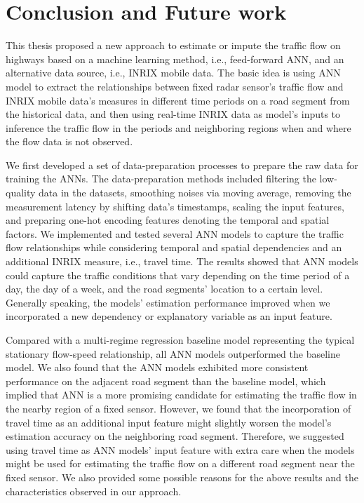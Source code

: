 \documentclass[english]{kththesis}
\begin{document}
\chapter{Conclusion and Future work}
\label{ch:conclusionAndFutureWork}
This thesis proposed a new approach to estimate or impute the traffic flow on highways based on a machine learning method, i.e., feed-forward ANN, and an alternative data source, i.e., INRIX mobile data. The basic idea is using ANN model to extract the relationships between fixed radar sensor's traffic flow and INRIX mobile data's measures in different time periods on a road segment from the historical data, and then using real-time INRIX data as model's inputs to inference the traffic flow in the periods and neighboring regions when and where the flow data is not observed. 

We first developed a set of data-preparation processes to prepare the raw data for training the ANNs. The data-preparation methods included filtering the low-quality data in the datasets, smoothing noises via moving average, removing the measurement latency by shifting data's timestamps, scaling the input features, and preparing one-hot encoding features denoting the temporal and spatial factors. We implemented and tested several ANN models to capture the traffic flow relationships while considering temporal and spatial dependencies and an additional INRIX measure, i.e., travel time. The results showed that ANN models could capture the traffic conditions that vary depending on the time period of a day, the day of a week, and the road segments' location to a certain level. Generally speaking, the models' estimation performance improved when we incorporated a new dependency or explanatory variable as an input feature.

Compared with a multi-regime regression baseline model representing the typical stationary flow-speed relationship, all ANN models outperformed the baseline model. We also found that the ANN models exhibited more consistent performance on the adjacent road segment than the baseline model, which implied that ANN is a more promising candidate for estimating the traffic flow in the nearby region of a fixed sensor. However, we found that the incorporation of travel time as an additional input feature might slightly worsen the model's estimation accuracy on the neighboring road segment. Therefore, we suggested using travel time as ANN models' input feature with extra care when the models might be used for estimating the traffic flow on a different road segment near the fixed sensor. We also provided some possible reasons for the above results and the characteristics observed in our approach.
\end{document}
